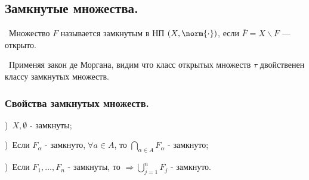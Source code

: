 \subsection*{Замкнутые множества.}

\noindent \textasteriskcentered~Множество $F$ называется замкнутым в НП $(X,\norm{\cdot})$, если $\overline{F} = X \backslash F$ — открыто.

\smallskip
\noindent \textbullet~Применяя закон де Моргана, видим что класс открытых множеств $\tau$ двойственен классу замкнутых множеств.


\subsubsection*{Свойства замкнутых множеств.}

)~$X, \emptyset$ - замкнуты;

)~Если $F_\alpha$ - замкнуто,$ \; \forall a \in A$, то $\bigcap\limits_{\alpha \in A} F_\alpha$ - замкнуто;

)~Если $F_1, \dots, F_n$ - замкнуты, то $\Rightarrow \bigcup\limits_{j = 1}^n F_j$ - замкнуто.